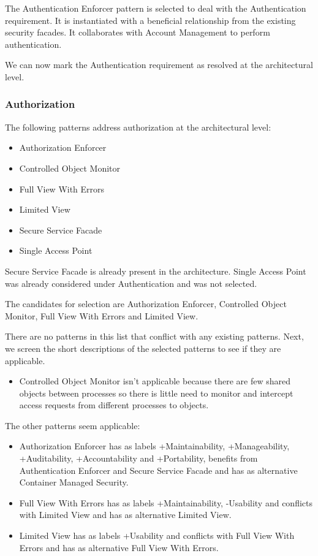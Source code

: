 \documentclass[a4paper,11pt]{report}
\begin{document}
The Authentication Enforcer pattern is selected to deal with the Authentication requirement. It is instantiated with a beneficial relationship from the existing security facades. It collaborates with Account Management to perform authentication.

We can now mark the Authentication requirement as resolved at the architectural level.

\subsubsection{Authorization}

The following patterns address authorization at the architectural level:
\begin{itemize}
\item Authorization Enforcer
\item Controlled Object Monitor
\item Full View With Errors
\item Limited View
\item Secure Service Facade
\item Single Access Point
\end{itemize}

Secure Service Facade is already present in the architecture.
Single Access Point was already considered under Authentication and was not selected.

The candidates for selection are Authorization Enforcer, Controlled Object Monitor, Full View With Errors
and Limited View.

There are no patterns in this list that conflict with any existing patterns.
Next, we screen the short descriptions of the selected patterns to see if they are applicable.
\begin{itemize}
\item Controlled Object Monitor isn't applicable because there are few shared objects between processes so
there is little need to monitor and intercept access requests from different processes to objects.
\end{itemize}
The other patterns seem applicable:
\begin{itemize}
\item Authorization Enforcer has as labels +Maintainability, +Manageability, +Auditability, +Accountability and
+Portability, benefits from Authentication Enforcer and Secure Service Facade and has as alternative
Container Managed Security.

\item Full View With Errors has as labels +Maintainability, -Usability and conflicts with Limited View and has as
alternative Limited View.

\item Limited View has as labels +Usability and conflicts with Full View With Errors and has as alternative Full View
With Errors.
\end{itemize}
\end{document}
